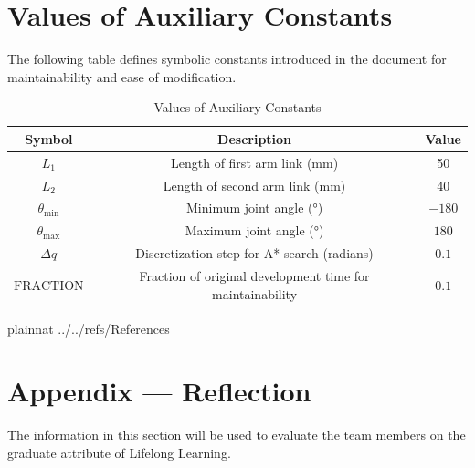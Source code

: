 \documentclass[12pt]{article}
\begin{document}
\section{Values of Auxiliary Constants}

The following table defines symbolic constants introduced in the document for maintainability and ease of modification.

\begin{table}[h!]
\centering
\begin{tabular}{|c|c|c|}
\hline
\textbf{Symbol} & \textbf{Description} & \textbf{Value} \\
\hline
$L_1$ & Length of first arm link (\si{\milli\metre}) & 50 \\
$L_2$ & Length of second arm link (\si{\milli\metre}) & 40 \\
$\theta_{\min}$ & Minimum joint angle (\si{\degree}) & $-180$ \\
$\theta_{\max}$ & Maximum joint angle (\si{\degree}) & $180$ \\
$\Delta q$ & Discretization step for A* search (radians) & $0.1$ \\
$\text{FRACTION}$ & Fraction of original development time for maintainability & $0.1$ \\
\hline
\end{tabular}
\caption{Values of Auxiliary Constants}
\label{Table:AuxiliaryConstants}
\end{table}

\newpage

 {plainnat}
 {../../refs/References}

\newpage

\newpage{}
\section*{Appendix --- Reflection}


The information in this section will be used to evaluate the team members on the
graduate attribute of Lifelong Learning.  



\end{document}
